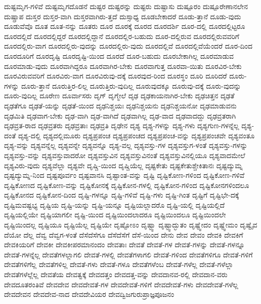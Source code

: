 {ದುಷ್ಟಮೃಗ-ಗಳಿವೆ
ದುಷ್ಟಮೃಗದೊಡನೆ
ದುಷ್ಟರ
ದುಷ್ಟರನ್ನು
ದುಷ್ಟರು
ದುಷ್ಟಾಸು
ದುಷ್ಪೂರಂ
ದುಷ್ಪೂರೇಣಾನಲೇನ
ದುಷ್ಪ್ರಾಪ
ದುಸ್ತರ
ದುಸ್ತರ-ವಾಗಿ
ದುಸ್ತರವಾಗಿರು-ತ್ತದೆ
ದುಸ್ಸಾಧ್ಯ
ದೂಡಬೇಕಾದರೆ
ದೂಡು-ತ್ತಾನೆ
ದೂಡು-ವುದು
ದೂಡುವೆವೊ
ದೂತ
ದೂತ-ನನ್ನು
ದೂತರು
ದೂರ
ದೂರಕ್ಕೆ
ದೂರದ
ದೂರದರ್ಶಿ
ದೂರ-ದಲ್ಲಿ
ದೂರದಲ್ಲಿಟ್ಟರೂ
ದೂರದಲ್ಲಿದೆ
ದೂರದಲ್ಲಿದ್ದರೆ
ದೂರದಲ್ಲಿದ್ದಾನೆ
ದೂರದಲ್ಲಿರ-ಬಹುದು
ದೂರ-ದಲ್ಲಿರುವ
ದೂರದಲ್ಲಿರುವವರಿಗೆ
ದೂರದಲ್ಲಿರು-ವಾಗ
ದೂರದಲ್ಲಿರು-ವುದನ್ನು
ದೂರದಲ್ಲಿರು-ವುದು
ದೂರದಲ್ಲಿವೆ
ದೂರದಲ್ಲಿವೆಯೆಂದರೆ
ದೂರ-ದಿಂದ
ದೂರದೂರಿಗೆ
ದೂರದೃಷ್ಟಿ
ದೂರದೃಷ್ಟಿ-ಯಿಂದ
ದೂರದೆ
ದೂರ-ಬಹುದು
ದೂರಬೇಕಾಗಿಲ್ಲ
ದೂರಮಾಡುವ
ದೂರಮಾಡು-ವುದು
ದೂರವಾಗಿದ್ದರೂ
ದೂರವಾಗಿರ-ಬೇಕು
ದೂರವಾಗುತ್ತ
ದೂರವಾ-ಯಿತು
ದೂರವಿರ-ಬೇಕು
ದೂರವಿರುವವರಿಗೆ
ದೂರವಿರು-ವಾಗ
ದೂರವಿರುವು-ದಕ್ಕೆ
ದೂರವುದ-ರಿಂದ
ದೂರಸ್ಥಂ
ದೂರಿ
ದೂರಿದರೆ
ದೂರು-ಗಳನ್ನು
ದೂರು-ತ್ತಾನೆ
ದೂರುತ್ತಿರ-ಲಿಲ್ಲ
ದೂರುತ್ತಿರು-ವುದಿಲ್ಲ
ದೂರುವುದಕ್ಕೂ
ದೂರುವು-ದಕ್ಕೆ
ದೂರು-ವುದನ್ನು
ದೂರು-ವುದಿಲ್ಲ
ದೂರೇಣ
ದೂರ್ವಾಸರು
ದೃಗ್
ದೃಗ್ಮೇಲೆ
ದೃಢ
ದೃಢಕಾಯನಾಗಿರ-ಬೇಕು
ದೃಢಚಿತ್ತನ
ದೃಢತೆ
ದೃಢತೆಗೂ
ದೃಢತೆ-ಯನ್ನು
ದೃಢತೆ-ಯಿಂದ
ದೃಢನಿಶ್ಚಯಃ
ದೃಢನಿಶ್ಚಯನು
ದೃಢನಿಶ್ಚಯನೋ
ದೃಢಮಾಡುವನು
ದೃಢಮಿತಿ
ದೃಢವಾಗ-ಬೇಕು
ದೃಢ-ವಾಗಿ
ದೃಢ-ವಾಗಿದೆ
ದೃಢವಾಗಿಲ್ಲ
ದೃಢ-ವಾದ
ದೃಢವಾದದ್ದು
ದೃಢವ್ರತರಾಗಿ
ದೃಢವ್ರತ-ರಾದ
ದೃಢವ್ರತರು
ದೃಢವ್ರತಾಃ
ದೃಢವ್ರತಿ
ದೃಢೇನ
ದೃಶ್ಯ
ದೃಶ್ಯ-ಗಳನ್ನು
ದೃಶ್ಯ-ಗಳು
ದೃಶ್ಯಗುಣ-ಗಳನ್ನೆಲ್ಲ
ದೃಶ್ಯ-ದಂತೆ
ದೃಶ್ಯ-ದಲ್ಲಿ
ದೃಶ್ಯದಲ್ಲಿಮೂರು
ದೃಶ್ಯಪ್ರಪಂಚ
ದೃಶ್ಯಪ್ರಪಂಚದ
ದೃಶ್ಯಪ್ರಪಂಚ-ವನ್ನು
ದೃಶ್ಯಪ್ರಪಂಚವೇ
ದೃಶ್ಯವಂತೂ
ದೃಶ್ಯ-ವನ್ನು
ದೃಶ್ಯವನ್ನೆಲ್ಲ
ದೃಶ್ಯವನ್ನೇ
ದೃಶ್ಯವನ್ನೊ
ದೃಶ್ಯ-ವಲ್ಲ
ದೃಶ್ಯವಸ್ತು-ಗಳ
ದೃಶ್ಯವಸ್ತುಗ-ಳಂತೆ
ದೃಶ್ಯವಸ್ತು-ಗಳನ್ನು
ದೃಶ್ಯವಸ್ತು-ವನ್ನು
ದೃಶ್ಯವಸ್ತುವಾದರೋ
ದೃಶ್ಯವಸ್ತುವಿನ
ದೃಶ್ಯವಸ್ತುವಿನಂತೆ
ದೃಶ್ಯವಸ್ತುವಿನಲ್ಲಿಯೂ
ದೃಶ್ಯವಾದಮೇಲೆ
ದೃಶ್ಯವಿರು-ವುದು
ದೃಶ್ಯವೆಲ್ಲಾ
ದೃಶ್ಯವೇ
ದೃಷ್ಚಿ-ಯಿಂದ
ದೃಷ್ಚಿಯೆಲ್ಲ
ದೃಷ್ಟಕೇತು
ದೃಷ್ಟಕೇತುಶ್ಚೇಕಿತಾನಃ
ದೃಷ್ಟದ್ಯುಮ್ನ
ದೃಷ್ಟದ್ಯುಮ್ನ-ನಿಂದ
ದೃಷ್ಟಪೂರ್ವಂ
ದೃಷ್ಟವಾನಸಿ
ದೃಷ್ಟಾಂತ-ವನ್ನು
ದೃಷ್ಟಿ
ದೃಷ್ಟಿಕೋಣ-ಗಳಿಂದ
ದೃಷ್ಟಿಕೋಣ-ಗಳಿವೆ
ದೃಷ್ಟಿಕೋಣದ
ದೃಷ್ಟಿಕೋಣ-ವನ್ನು
ದೃಷ್ಟಿಕೋನಕ್ಕೆ
ದೃಷ್ಟಿಕೋನ-ಗಳಲ್ಲಿ
ದೃಷ್ಟಿಕೋನ-ಗಳಿಂದ
ದೃಷ್ಟಿಕೋನಗಳಿಂದಲೂ
ದೃಷ್ಟಿಕೋನದ
ದೃಷ್ಟಿಕೋನ-ದಿಂದ
ದೃಷ್ಟಿ-ಗಳನ್ನೂ
ದೃಷ್ಟಿ-ಗಳಿವೆ
ದೃಷ್ಟಿ-ಗಳು
ದೃಷ್ಟಿ-ಗಿಂತ
ದೃಷ್ಟಿಗೆ
ದೃಷ್ಟಿಭೇ-ದಕ್ಕೆ
ದೃಷ್ಟಿಮವಷ್ಟಭ್ಯ
ದೃಷ್ಟಿಯ
ದೃಷ್ಟಿ-ಯನ್ನು
ದೃಷ್ಟಿ-ಯನ್ನೂ
ದೃಷ್ಟಿಯಲ್ಲಾದರೊ
ದೃಷ್ಟಿ-ಯಲ್ಲಿ
ದೃಷ್ಟಿಯಲ್ಲಿದೆ
ದೃಷ್ಟಿಯಲ್ಲಿಯೇ
ದೃಷ್ಟಿಯಾಗಲೀ
ದೃಷ್ಟಿ-ಯಿಂದ
ದೃಷ್ಟಿಯಿಂದಲಾದರೂ
ದೃಷ್ಟಿಯಿಂದಲೂ
ದೃಷ್ಟಿಯಿಂದಲೇ
ದೃಷ್ಟಿಯಿಂದಲ್ಲ
ದೃಷ್ಟಿಯೂ
ದೃಷ್ಟಿಯೆಲ್ಲ
ದೃಷ್ಟಿಯೇ
ದೃಷ್ಟೋಽಂ
ದೃಷ್ಟ್ವಾ
ದೃಷ್ಟ್ವಾದ್ಭುತಂ
ದೃಷ್ಟ್ವೇದಂ
ದೃಷ್ಟ್ವೇಮಂ
ದೃಷ್ವೈವ
ದೆಯೋ
ದೆಲ್ಲ
ದೆವ್ವ
ದೆವ್ವಗ-ಳಂತೆ
ದೆಸೆದೆಸೆಗೂ
ದೆಸೆದೆಸೆಗೆ
ದೆಸೆ-ಯಿಂದ
ದೇನು
ದೇವ
ದೇವಂ
ದೇವಕಿ
ದೇವಕಿಗೆ
ದೇವಕಿಯರಿಗೆ
ದೇವಕೀ
ದೇವಕೀಪರಮಾನಂದಂ
ದೇವತಾಃ
ದೇವತೆ
ದೇವತೆ-ಗಳ
ದೇವತೆ-ಗಳನ್ನು
ದೇವತೆ-ಗಳನ್ನೂ
ದೇವತೆ-ಗಳನ್ನೆಲ್ಲ
ದೇವತೆಗಳಲ್ಲಾಗಲಿ
ದೇವತೆ-ಗಳಲ್ಲಿ
ದೇವತೆಗಳಾಗಲಿ
ದೇವತೆ-ಗಳಿಂದ
ದೇವತೆಗಳಿಗೂ
ದೇವತೆ-ಗಳಿಗೆ
ದೇವತೆಗಳಿಗೆಲ್ಲ
ದೇವತೆಗಳಿಲ್ಲ
ದೇವತೆ-ಗಳು
ದೇವತೆ-ಗಳೂ
ದೇವತೆಗಳೆಂಬ
ದೇವತೆ-ಗಳೆಲ್ಲ
ದೇವತೆ-ಗಳೆಲ್ಲಾ
ದೇವತೆಗಳೆಲ್ಲೆಲ್ಲ
ದೇವತೆಯ
ದೇವತ್ವಕ್ಕೆ
ದೇವದತ್ತಂ
ದೇವದತ್ತ-ವನ್ನು
ದೇವದಾನವ-ರಲ್ಲಿ
ದೇವದಾನ-ವರು
ದೇವದೂತರಂತಿವೆ
ದೇವದೇವ
ದೇವದೇವತೆ-ಗಳ
ದೇವದೇವತೆ-ಗಳಿಗೆ
ದೇವದೇವತೆ-ಗಳು
ದೇವದೇವತೆ-ಗಳೆಲ್ಲ
ದೇವದೇವನ
ದೇವದೇವ-ನಾದ
ದೇವದೇವಿಯರ
ದೇವದ್ವಿಜಗುರುಪ್ರಾಜ್ಞಪೂಜನಂ
}
